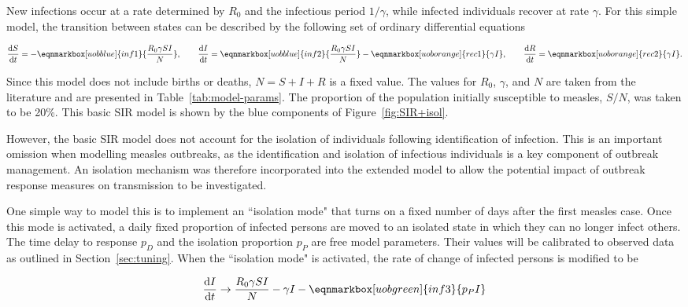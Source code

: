 \documentclass[12pt]{article}
\newcommand{\diff}{\mathrm{d}}
\begin{document}
New infections occur at a rate determined by $R_0$ and the infectious period $1/\gamma$, while infected individuals recover at rate $\gamma$. For this simple model, the transition between states can be described by the following set of ordinary differential equations

\vspace{0.5em}
\begin{equation}
    \frac{\diff S}{\diff t} = -\eqnmarkbox[uobblue]{inf1}{\frac{R_0\gamma SI}{N}}, 
    \qquad 
    \frac{\diff I}{\diff t} = \eqnmarkbox[uobblue]{inf2}{\frac{R_0\gamma SI}{N}} - \eqnmarkbox[uoborange]{rec1}{\gamma I}, 
    \qquad 
    \frac{\diff R}{\diff t} = \eqnmarkbox[uoborange]{rec2}{\gamma I}.
    \label{eq:SIR}
\end{equation}
\vspace{1.5em}

Since this model does not include births or deaths, $N = S + I + R$ is a fixed value. The values for $R_0$, $\gamma$, and $N$ are taken from the literature and are presented in Table~\ref{tab:model-params}. The proportion of the population initially susceptible to measles, $S/N$, was taken to be 20\%. This basic SIR model is shown by the blue components of Figure~\ref{fig:SIR+isol}. 

However, the basic SIR model does not account for the isolation of individuals following identification of infection. This is an important omission when modelling measles outbreaks, as the identification and isolation of infectious individuals is a key component of outbreak management. An isolation mechanism was therefore incorporated into the extended model to allow the potential impact of outbreak response measures on transmission to be investigated.

One simple way to model this is to implement an ``isolation mode" that turns on a fixed number of days after the first measles case. Once this mode is activated, a daily fixed proportion of infected persons are moved to an isolated state in which they can no longer infect others. The time delay to response $p_D$ and the isolation proportion $p_P$ are free model parameters. Their values will be calibrated to observed data as outlined in Section~\ref{sec:tuning}. When the ``isolation mode" is activated, the rate of change of infected persons is modified to be

\begin{equation}
    \frac{\diff I}{\diff t} \rightarrow \frac{R_0\gamma SI}{N} - \gamma I - \eqnmarkbox[uobgreen]{inf3}{p_P I}
    \label{eq:isolation}
\end{equation}
\vspace{1.5em}
\end{document}
